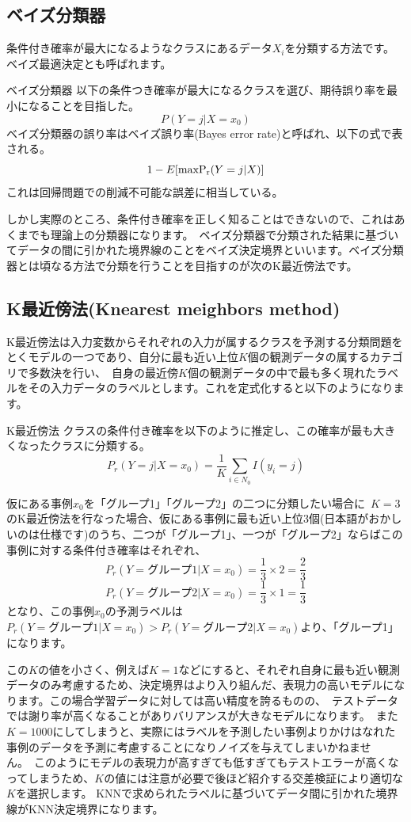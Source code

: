 \documentclass[uplatex]{jsarticle}
\begin{document}
\subsection{ベイズ分類器}
条件付き確率が最大になるようなクラスにあるデータ$X_i$を分類する方法です。ベイズ最適決定とも呼ばれます。
\begin{itembox}[l]{ベイズ分類器}
  以下の条件つき確率が最大になるクラスを選び、期待誤り率を最小になることを目指した。
  $$P(Y = j|X = x_0)$$
  ベイズ分類器の誤り率はベイズ誤り率(Bayes error rate)と呼ばれ、以下の式で表される。\
  $$1 - E[{\rm max P_r}(Y = j|X)]$$
  これは回帰問題での削減不可能な誤差に相当している。
\end{itembox}
しかし実際のところ、条件付き確率を正しく知ることはできないので、これはあくまでも理論上の分類器になります。\
ベイズ分類器で分類された結果に基づいてデータの間に引かれた境界線のことをベイズ決定境界といいます。ベイズ分類器とは頃なる方法で分類を行うことを目指すのが次のK最近傍法です。

\subsection{K最近傍法(Knearest meighbors method)}
K最近傍法は入力変数からそれぞれの入力が属するクラスを予測する分類問題をとくモデルの一つであり、自分に最も近い上位$K$個の観測データの属するカテゴリで多数決を行い、\
自身の最近傍$K$個の観測データの中で最も多く現れたラベルをその入力データのラベルとします。これを定式化すると以下のようになります。
\begin{itembox}[l]{K最近傍法}
  クラスの条件付き確率を以下のように推定し、この確率が最も大きくなったクラスに分類する。
    $$P_r(Y = j|X = x_0) = \frac{1}{K}\sum_{i \in N_0} I(y_i = j)$$
\end{itembox}
仮にある事例$x_0$を「グループ1」「グループ2」の二つに分類したい場合に\
$K=3$のK最近傍法を行なった場合、仮にある事例に最も近い上位3個(日本語がおかしいのは仕様です)のうち、二つが「グループ1」、一つが「グループ2」ならばこの事例に対する条件付き確率はそれぞれ、\
$$P_r(Y=グループ1 | X = x_0) = \frac{1}{3}\times2 = \frac{2}{3}$$
$$P_r(Y=グループ2 | X = x_0) = \frac{1}{3}\times1 = \frac{1}{3}$$
となり、この事例$x_0$の予測ラベルは$P_r(Y=グループ1 | X = x_0) > P_r(Y=グループ2 | X = x_0)$より、「グループ1」になります。

この$K$の値を小さく、例えば$K = 1$などにすると、それぞれ自身に最も近い観測データのみ考慮するため、決定境界はより入り組んだ、表現力の高いモデルになります。この場合学習データに対しては高い精度を誇るものの、\
テストデータでは謝り率が高くなることがありバリアンスが大きなモデルになります。\
また$K = 1000$にしてしまうと、実際にはラベルを予測したい事例よりかけはなれた事例のデータを予測に考慮することになりノイズを与えてしまいかねません。\
このようにモデルの表現力が高すぎても低すぎてもテストエラーが高くなってしまうため、$K$の値には注意が必要で後ほど紹介する交差検証により適切な$K$を選択します。
KNNで求められたラベルに基づいてデータ間に引かれた境界線がKNN決定境界になります。\
\end{document}
